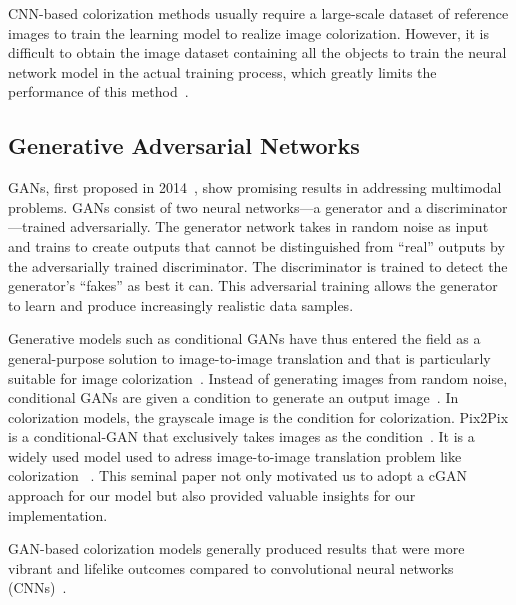 \documentclass[10pt,twocolumn,letterpaper]{article}
\begin{document}
CNN-based colorization methods usually require a large-scale  dataset of reference images to train the learning model to realize image colorization. However, it is difficult to obtain the image dataset containing all the objects to train the neural network model in the actual training process, which greatly limits the performance of this method~\cite{Huang}. 

\subsection{Generative Adversarial Networks}
GANs, first proposed in 2014~\cite{Goodfellow}, show promising results in addressing multimodal problems.  GANs consist of two neural networks—a generator and a discriminator—trained adversarially. The generator network takes in random noise as input and trains to create outputs that cannot be distinguished from “real” outputs by the adversarially trained discriminator. The discriminator is trained to detect the generator’s “fakes” as best it can. This adversarial training allows the generator to learn and produce increasingly realistic data samples.

Generative models such as conditional GANs have thus entered the field as a general-purpose solution to image-to-image translation and that is particularly suitable for image colorization~\cite{Huang, Zhang}. Instead of generating images from random noise, conditional GANs are given a condition to generate an output image~\cite{Mirza}.  In colorization models, the grayscale image is the condition for colorization. Pix2Pix is a conditional-GAN that exclusively takes images as the condition~\cite{Pix2Pix}. It is a widely used model used to adress image-to-image translation problem like colorization ~\cite{Zhao}. This seminal paper not only motivated us to adopt a cGAN approach for our model but also provided valuable insights for our implementation.

GAN-based colorization models generally produced results that were more vibrant and lifelike outcomes compared to convolutional neural networks (CNNs)~\cite{Pix2Pix}.
\end{document}
